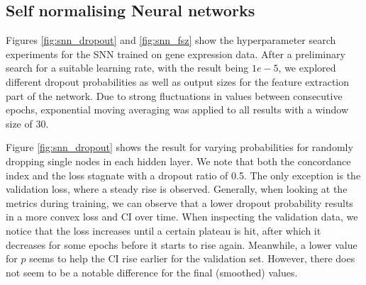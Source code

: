 \subsection{Self normalising Neural networks}

Figures \ref{fig:snn_dropout} and \ref{fig:snn_fsz} show the hyperparameter search experiments for the SNN trained on gene expression data. After a preliminary search for a suitable learning rate, with the result being \(1e-5\), we explored different dropout probabilities as well as output sizes for the feature extraction part of the network. Due to strong fluctuations in values between consecutive epochs, exponential moving averaging was applied to all results with a window size of 30. 

Figure \ref{fig:snn_dropout} shows the result for varying probabilities for randomly dropping single nodes in each hidden layer. We note that both the concordance index and the loss stagnate with a dropout ratio of 0.5. The only exception is the validation loss, where a steady rise is observed. Generally, when looking at the metrics during training, we can observe that a lower dropout probability results in a more convex loss and CI over time. 
When inspecting the validation data, we notice that the loss increases until a certain plateau is hit, after which it decreases for some epochs before it starts to rise again. Meanwhile, a lower value for $p$ seems to help the CI rise earlier for the validation set. However, there does not seem to be a notable difference for the final (smoothed) values.

